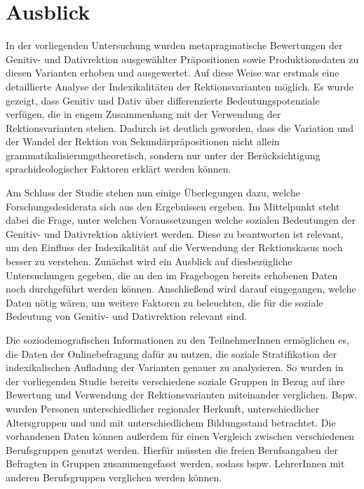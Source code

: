 \chapter{Ausblick}
\label{cha:Ausblick}
In der vorliegenden Untersuchung wurden metapragmatische Bewertungen der Genitiv- und Dativrektion ausgewählter Präpositionen sowie Produktionsdaten zu diesen Varianten erhoben und ausgewertet. 
Auf diese Weise war erstmals eine detaillierte Analyse der Indexikalitäten der Rektionsvarianten möglich. 
Es wurde gezeigt, dass Genitiv und Dativ über differenzierte Bedeutungspotenziale verfügen, die in engem Zusammenhang mit der Verwendung der Rektionsvarianten stehen. 
Dadurch ist deutlich geworden, dass die Variation und der Wandel der Rektion von Sekundärpräpositionen nicht allein grammatikalisierungstheoretisch, sondern nur unter der Berücksichtigung sprachideologischer Faktoren erklärt werden können. 

Am Schluss der Studie stehen nun einige Überlegungen dazu, welche Forschungsdesiderata sich aus den Ergebnissen ergeben. 
Im Mittelpunkt steht dabei die Frage, unter welchen Voraussetzungen welche sozialen Bedeutungen der Genitiv- und Dativrektion aktiviert werden. 
Diese zu beantworten ist relevant, um den Einfluss der Indexikalität auf die Verwendung der Rektionskasus noch besser zu verstehen.  
Zunächst wird ein Ausblick auf diesbezügliche Untersuchungen gegeben, die an den im Fragebogen bereits erhobenen Daten noch durchgeführt werden können. 
Anschließend wird darauf eingegangen, welche Daten nötig wären, um weitere Faktoren zu beleuchten, die für die soziale Bedeutung von Genitiv- und Dativrektion relevant sind. 

Die soziodemografischen Informationen zu den TeilnehmerInnen ermöglichen es, die Daten der Onlinebefragung dafür zu nutzen, die soziale Stratifikation der indexikalischen Aufladung der Varianten genauer zu analysieren. 
So wurden in der vorliegenden Studie bereits verschiedene soziale Gruppen in Bezug auf ihre Bewertung und Verwendung der Rektionsvarianten miteinander verglichen. 
Bspw. wurden Personen unterschiedlicher regionaler Herkunft, unterschiedlicher Altersgruppen und und mit unterschiedlichem Bildungsstand betrachtet. 
Die vorhandenen Daten können außerdem für einen Vergleich zwischen verschiedenen Berufsgruppen genutzt werden. 
Hierfür müssten die freien Berufsangaben der Befragten in Gruppen zusammengefasst werden, sodass bspw. LehrerInnen mit anderen Berufsgruppen verglichen werden können. 

